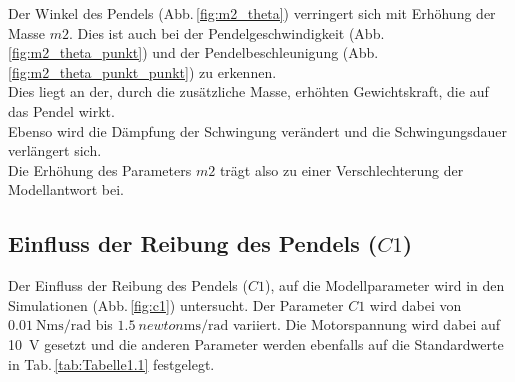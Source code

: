 Der Winkel des Pendels (Abb.\,\ref{fig:m2_theta}) verringert sich mit Erhöhung der Masse $m2$. 
Dies ist auch bei der Pendelgeschwindigkeit (Abb.\,\ref{fig:m2_theta_punkt}) und der Pendelbeschleunigung (Abb.\,\ref{fig:m2_theta_punkt_punkt}) zu erkennen.\\
Dies liegt an der, durch die zusätzliche Masse, erhöhten Gewichtskraft, die auf das Pendel wirkt.\\
Ebenso wird die Dämpfung der Schwingung verändert und die Schwingungsdauer verlängert sich.\\

Die Erhöhung des Parameters $m2$ trägt also zu einer Verschlechterung der Modellantwort bei.

\subsection*{Einfluss der Reibung des Pendels ($C1$)}
Der Einfluss der Reibung des Pendels ($C1$), auf die Modellparameter wird in den Simulationen (Abb.\,\ref{fig:c1}) untersucht. 
Der Parameter $C1$ wird dabei von $\SI{0.01}{\newton\meter\second\per\radian}$ bis $\SI{1.5}{newton\meter\second\per\radian}$ variiert.
Die Motorspannung wird dabei auf \SI{10}{\volt} gesetzt und die anderen Parameter werden ebenfalls auf die Standardwerte in Tab.\,\ref{tab:Tabelle1.1} festgelegt.\\

